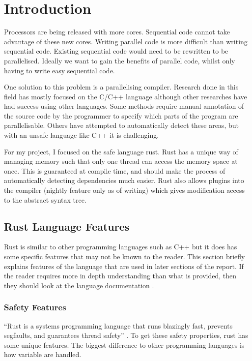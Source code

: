 \chapter{Introduction}

Processors are being released with more cores. Sequential code cannot take advantage of these new cores. Writing parallel code is more difficult than writing sequential code. Existing sequential code would need to be rewritten to be parallelised. Ideally we want to gain the benefits of parallel code, whilst only having to write easy sequential code.

One solution to this problem is a parallelising compiler. Research done in this field has mostly focused on the C/C++ language although other researches have had success using other languages. Some methods require manual annotation of the source code by the programmer to specify which parts of the program are parallelisable. Others have attempted to automatically detect these areas, but with an unsafe language like C++ it is challenging.

For my project, I focused on the safe language rust. Rust has a unique way of managing memory such that only one thread can access the memory space at once. This is guaranteed at compile time, and should make the process of automatically detecting dependencies much easier. Rust also allows plugins into the compiler (nightly feature only as of writing) which gives modification access to the abstract syntax tree.


\section{Rust Language Features}
\label{sec:rust-language-features}
Rust is similar to other programming languages such as C++ but it does has some specific features that may not be known to the reader. This section briefly explains features of the language that are used in later sections of the report. If the reader requires more in depth understanding than what is provided, then they should look at the language documentation \parencite{rustbook}.

\subsection{Safety Features}
``Rust is a systems programming language that runs blazingly fast, prevents segfaults, and guarantees thread safety'' \parencite{rustlang}. To get these safety properties, rust has some unique features. The biggest difference to other programming languages is how variable are handled.

